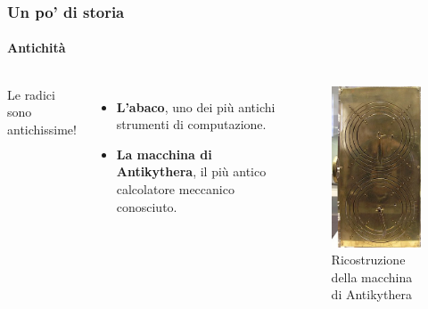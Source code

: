 \documentclass[11pt]{beamer}
\begin{document}
    \begin{frame}
        \frametitle{Un po' di storia}
        \framesubtitle{Antichità}

        \begin{columns}

            Le radici sono antichissime!

            \begin{itemize}
                \item \textbf{L'abaco}, uno dei più antichi strumenti di computazione.

                \item \textbf{La macchina di Antikythera}, il più antico calcolatore meccanico conosciuto.
            \end{itemize}

            \begin{figure}
                \includegraphics[scale=0.3]{img/macchina-antikythera.jpg}
                \caption{Ricostruzione della macchina di Antikythera}
            \end{figure}
        \end{columns}
    \end{frame}
\end{document}

